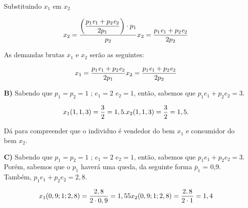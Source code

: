 \documentclass[a4paper, 12pt]{article} %
\begin{document}
\begin{flushleft}
\begin{center}
Substituindo $x_{1}$ em $x_{2}$
\end{center}

\begin{equation}
x_{2} = \dfrac{\left( \dfrac{p_{1}\textit{e}_{1} + p_{2}\textit{e}_{2}}{2p_{1}}\right)\cdot p_{1}}{p_{2}}
$$\\$$
x_{2} = \dfrac{p_{1}\textit{e}_{1} + p_{2}\textit{e}_{2}}{2p_{2}}
\end{equation}

\begin{center}
As demandas brutas $x_{1}$ e $x_{2}$ serão as seguintes:

\begin{equation}
x_{1} = \dfrac{p_{1}\textit{e}_{1} + p_{2}\textit{e}_{2}}{2p_{1}}
$$\\$$
x_{2} = \dfrac{p_{1}\textit{e}_{1} + p_{2}\textit{e}_{2}}{2p_{2}}
\end{equation}

\end{center}

\singlespacing

\textbf{B)} Sabendo que $p_{1} = p_{2} = 1$ ; $\textit{e}_{1} = 2$  $\textit{e}_{2} = 1$, então, sabemos que $p_{1}\textit{e}_{1} + p_{2}\textit{e}_{2} = 3$.

\begin{equation}
x_{1}(1,1,3) = \dfrac{3}{2} = 1,5.
$$\\$$
x_{2}(1,1,3) = \dfrac{3}{2} = 1,5.
\end{equation}

\begin{center}
Dá para compreender que o individuo é vendedor do bem $x_{1}$ e consumidor do bem $x_{2}$.
\end{center}

\singlespacing

\textbf{C)} Sabendo que $p_{1} = p_{2} = 1$ ; $\textit{e}_{1} = 2$  $\textit{e}_{2} = 1$, então, sabemos que $p_{1}\textit{e}_{1} + p_{2}\textit{e}_{2} = 3$. Porém, sabemos que o $p_{1}$ haverá uma queda, da seguinte forma $\overline{p}_{1}$ = 0,9. Também, $p_{1}\textit{e}_{1} + p_{2}\textit{e}_{2} = 2,8$.

\begin{equation}
x_{1}(0,9;1;2,8) = \dfrac{2,8}{2 \cdot 0,9} = 1,55
$$\\$$
x_{2}(0,9;1;2,8) = \dfrac{2,8}{2 \cdot 1} = 1,4
\end{equation}


\end{flushleft}
\end{document}

